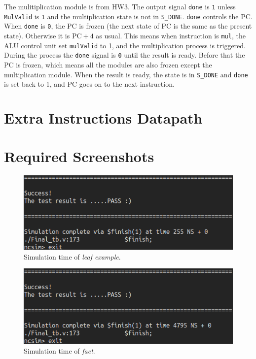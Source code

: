 \documentclass[12pt]{article}
\begin{document}
The mulitiplication module is from HW3. The output signal \texttt{done} is 
\texttt{1} unless \texttt{MulValid} is \texttt{1} and the multiplication state
is not in \texttt{S\_DONE}. \texttt{done} controls the PC. When \texttt{done} is
\texttt{0}, the PC is frozen (the next state of PC is the same as the present state).
Otherwise it is $\text{PC}+4$ as usual. This means when instruction is \texttt{mul},
the ALU control unit set \texttt{mulValid} to 1, and the multiplication process
is triggered. During the process the \texttt{done} signal is \texttt{0} until
the result is ready. Before that the PC is frozen, which means all the modules
are also frozen except the multiplication module. When the result is ready, the
state is in \texttt{S\_DONE} and \texttt{done} is set back to 1, and PC goes 
on to the next instruction.

\section{Extra Instructions Datapath}

    

\section{Required Screenshots}%
\label{sec:required_screenshots}

\begin{figure}[H]
	\centering
	\includegraphics[width=\linewidth]{./leaf.png}
	\caption{Simulation time of \textit{leaf example}.}%
	\label{fig:leaf}
\end{figure}

\begin{figure}[H]
	\centering
	\includegraphics[width=\linewidth]{./fact.png}
	\caption{Simulation time of \textit{fact}.}%
	\label{fig:fact}
\end{figure}
\end{document}

